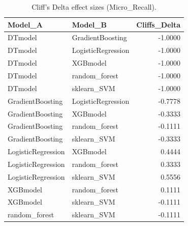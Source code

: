 \begin{table}[t]
\centering
\begin{tabular}{llr}
\toprule
Model_A & Model_B & Cliffs_Delta \\
\midrule
DTmodel & GradientBoosting & -1.0000 \\
DTmodel & LogisticRegression & -1.0000 \\
DTmodel & XGBmodel & -1.0000 \\
DTmodel & random_forest & -1.0000 \\
DTmodel & sklearn_SVM & -1.0000 \\
GradientBoosting & LogisticRegression & -0.7778 \\
GradientBoosting & XGBmodel & -0.3333 \\
GradientBoosting & random_forest & -0.1111 \\
GradientBoosting & sklearn_SVM & -0.3333 \\
LogisticRegression & XGBmodel & 0.4444 \\
LogisticRegression & random_forest & 0.3333 \\
LogisticRegression & sklearn_SVM & 0.5556 \\
XGBmodel & random_forest & 0.1111 \\
XGBmodel & sklearn_SVM & -0.1111 \\
random_forest & sklearn_SVM & -0.1111 \\
\bottomrule
\end{tabular}
\caption{Cliff's Delta effect sizes (Micro_Recall).}
\label{tab:cliffs_Micro_Recall}
\end{table}